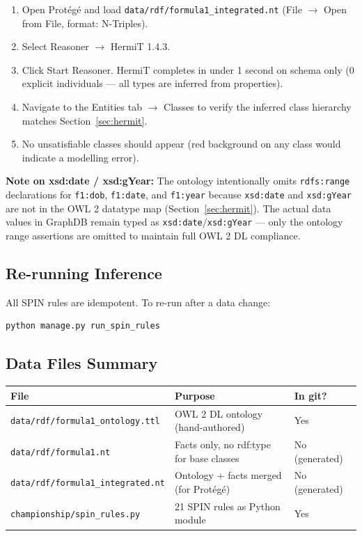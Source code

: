 \documentclass[12pt,a4paper]{article}
\begin{document}
\begin{enumerate}[leftmargin=2em]
  \item Open Protégé and load \texttt{data/rdf/formula1\_integrated.nt}
        (File $\to$ Open from File, format: N-Triples).
  \item Select Reasoner $\to$ HermiT 1.4.3.
  \item Click Start Reasoner. HermiT completes in under 1 second on schema only
        (0 explicit individuals --- all types are inferred from properties).
  \item Navigate to the Entities tab $\to$ Classes to verify the inferred
        class hierarchy matches Section~\ref{sec:hermit}.
  \item No unsatisfiable classes should appear (red background on any class
        would indicate a modelling error).
\end{enumerate}

\begin{infobox}
\textbf{Note on xsd:date / xsd:gYear:} The ontology intentionally omits
\texttt{rdfs:range} declarations for \texttt{f1:dob}, \texttt{f1:date}, and
\texttt{f1:year} because \texttt{xsd:date} and \texttt{xsd:gYear} are not
in the OWL 2 datatype map (Section~\ref{sec:hermit}). The actual data values
in GraphDB remain typed as \texttt{xsd:date}/\texttt{xsd:gYear} — only the
ontology range assertions are omitted to maintain full OWL 2 DL compliance.
\end{infobox}

\subsection{Re-running Inference}

All SPIN rules are idempotent. To re-run after a data change:

\begin{lstlisting}[style=shell]
python manage.py run_spin_rules
\end{lstlisting}

\subsection{Data Files Summary}

\begin{center}
\begin{tabular}{@{}lll@{}}
\toprule
\textbf{File} & \textbf{Purpose} & \textbf{In git?} \\
\midrule
\texttt{data/rdf/formula1\_ontology.ttl} & OWL 2 DL ontology (hand-authored) & Yes \\
\texttt{data/rdf/formula1.nt}            & Facts only, no rdf:type for base classes & No (generated) \\
\texttt{data/rdf/formula1\_integrated.nt} & Ontology + facts merged (for Protégé) & No (generated) \\
\texttt{championship/spin\_rules.py}     & 21 SPIN rules as Python module & Yes \\
\bottomrule
\end{tabular}
\end{center}
\end{document}
